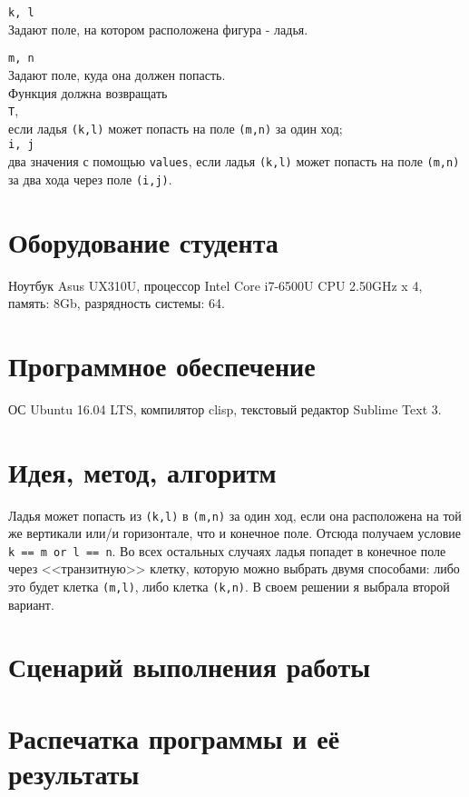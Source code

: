 \documentclass[12pt]{article}
\begin{document}
{\tt k, l}\\
Задают поле, на котором расположена фигура - ладья.

{\tt m, n}\\
Задают поле, куда она должен попасть.\\

Функция должна возвращать\\
{\tt T},\\
если ладья {\tt (k,l)} может попасть на поле {\tt (m,n)} за один ход;\\

{\tt i, j}\\
два значения с помощью {\tt values}, если ладья {\tt (k,l)} может попасть на поле {\tt (m,n)} за два хода через поле {\tt (i,j)}.



\section{Оборудование студента}
Ноутбук Asus UX310U, процессор Intel Core i7-6500U CPU 2.50GHz x 4, память: 8Gb, разрядность системы: 64.

\section{Программное обеспечение}
ОС Ubuntu 16.04 LTS, компилятор clisp, текстовый редактор Sublime Text 3.

\section{Идея, метод, алгоритм}
Ладья может попасть из {\tt (k,l)} в {\tt (m,n)} за один ход, если она расположена на той же вертикали или/и горизонтале, что и конечное поле. Отсюда получаем условие  {\tt k == m or l == n}. Во всех остальных случаях ладья попадет в конечное поле через <<транзитную>> клетку, которую можно выбрать двумя способами: либо это будет клетка {\tt (m,l)}, либо клетка  {\tt (k,n)}. В своем решении я выбрала второй вариант. 

\section{Сценарий выполнения работы}

\section{Распечатка программы и её результаты}
\end{document}
